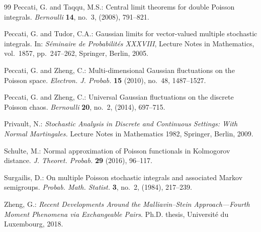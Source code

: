 \documentclass[ECP,preprint]{ejpecp}
\begin{document}
\begin{thebibliography}{99}
Peccati, G. and Taqqu, M.S.:
Central limit theorems for double Poisson integrals.
\emph{Bernoulli} \textbf{14}, no.~3, (2008), 791--821.

Peccati, G. and Tudor, C.A.:
Gaussian limits for vector-valued multiple stochastic integrals.
In: \emph{S\'eminaire de Probabilit\'es XXXVIII},
Lecture Notes in Mathematics, vol.~1857,
pp.~247--262,
Springer, Berlin, 2005.




Peccati, G. and Zheng, C.:
Multi-dimensional Gaussian fluctuations on the Poisson space.
\emph{Electron. J. Probab.} \textbf{15} (2010),
  no.~48, 1487--1527.

Peccati, G. and Zheng, C.:
Universal Gaussian fluctuations on the discrete Poisson chaos.
\emph{Bernoulli} \textbf{20}, no.~2, (2014), 697--715.

Privault, N.:
{\it Stochastic Analysis in Discrete and Continuous Settings:
With Normal Martingales.}
Lecture Notes in Mathematics 1982,
Springer, Berlin, 2009.

Schulte, M.:
Normal approximation of Poisson functionals in Kolmogorov distance.
\emph{J. Theoret. Probab.} \textbf{29} (2016), 96--117.

Surgailis, D.:
On multiple Poisson stochastic integrals and associated Markov
semigroups.
\emph{Probab. Math. Statist.} \textbf{3}, no.~2, (1984), 217--239.


Zheng, G.:
\emph{Recent Developments Around the Malliavin--Stein Approach---Fourth
Moment Phenomena via Exchangeable Pairs}.
Ph.D. thesis, Universit\'e du Luxembourg, 2018.

\end{thebibliography}
\end{document}
